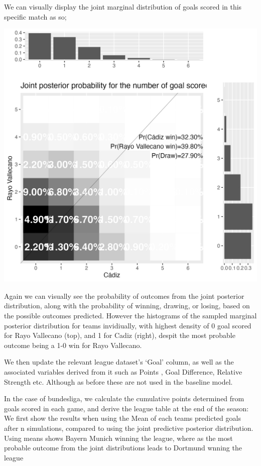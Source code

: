 \documentclass[
]{article}
\begin{document}
We can visually display the joint marginal distribution of goals scored
in this specific match as so;

\includegraphics[width=25in]{CadizVallecanoJM}

Again we can visually see the probability of outcomes from the joint
posterior distribution, along with the probability of winning, drawing,
or losing, based on the possible outcomes predicted. However the
histograms of the sampled marginal posterior distribution for teams
invidiually, with highest density of 0 goal scored for Rayo Vallecano
(top), and 1 for Cadiz (right), despit the most probable outcome being a
1-0 win for Rayo Vallecano.

We then update the relevant league dataset's `Goal' column, as well as
the associated variables derived from it such as Points , Goal
Difference, Relative Strength etc. Although as before these are not used
in the baseline model.

In the case of bundesliga, we calculate the cumulative points determined
from goals scored in each game, and derive the league table at the end
of the season: We first show the results when using the Mean of each
teams predicted goals after n simulations, compared to using the joint
predictive posterior distribution. Using means shows Bayern Munich
winning the league, where as the most probable outcome from the joint
distributions leads to Dortmund wnning the league
\end{document}
